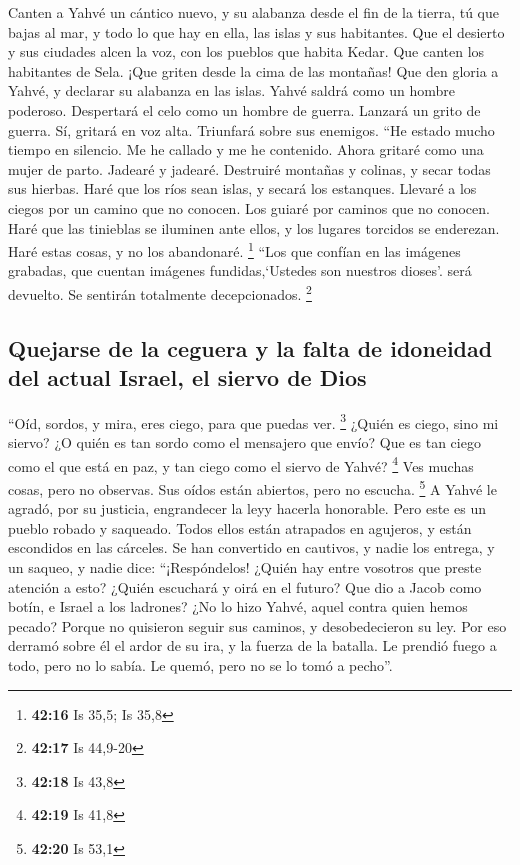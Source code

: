  Canten a Yahvé un cántico nuevo, y su alabanza desde el
fin de la tierra, tú que bajas al mar, y todo lo que hay en ella, las
islas y sus habitantes.  Que el desierto y sus ciudades
alcen la voz, con los pueblos que habita Kedar. Que canten los
habitantes de Sela. ¡Que griten desde la cima de las montañas!
 Que den gloria a Yahvé, y declarar su alabanza en las
islas.  Yahvé saldrá como un hombre poderoso. Despertará
el celo como un hombre de guerra. Lanzará un grito de guerra. Sí,
gritará en voz alta. Triunfará sobre sus enemigos.  ``He
estado mucho tiempo en silencio. Me he callado y me he contenido. Ahora
gritaré como una mujer de parto. Jadearé y jadearé. 
Destruiré montañas y colinas, y secar todas sus hierbas. Haré que los
ríos sean islas, y secará los estanques.  Llevaré a los
ciegos por un camino que no conocen. Los guiaré por caminos que no
conocen. Haré que las tinieblas se iluminen ante ellos, y los lugares
torcidos se enderezan. Haré estas cosas, y no los abandonaré.
\footnote{\textbf{42:16} Is 35,5; Is 35,8}  ``Los que
confían en las imágenes grabadas, que cuentan imágenes fundidas,`Ustedes
son nuestros dioses'. será devuelto. Se sentirán totalmente
decepcionados. \footnote{\textbf{42:17} Is 44,9-20}

\hypertarget{quejarse-de-la-ceguera-y-la-falta-de-idoneidad-del-actual-israel-el-siervo-de-dios}{%
\subsection{Quejarse de la ceguera y la falta de idoneidad del actual
Israel, el siervo de
Dios}\label{quejarse-de-la-ceguera-y-la-falta-de-idoneidad-del-actual-israel-el-siervo-de-dios}}

 ``Oíd, sordos, y mira, eres ciego, para que puedas ver.
\footnote{\textbf{42:18} Is 43,8}  ¿Quién es ciego, sino
mi siervo? ¿O quién es tan sordo como el mensajero que envío? Que es tan
ciego como el que está en paz, y tan ciego como el siervo de Yahvé?
\footnote{\textbf{42:19} Is 41,8}  Ves muchas cosas, pero
no observas. Sus oídos están abiertos, pero no escucha. \footnote{\textbf{42:20}
  Is 53,1}  A Yahvé le agradó, por su justicia,
engrandecer la leyy hacerla honorable.  Pero este es un
pueblo robado y saqueado. Todos ellos están atrapados en agujeros, y
están escondidos en las cárceles. Se han convertido en cautivos, y nadie
los entrega, y un saqueo, y nadie dice: ``¡Respóndelos! 
¿Quién hay entre vosotros que preste atención a esto? ¿Quién escuchará y
oirá en el futuro?  Que dio a Jacob como botín, e Israel
a los ladrones? ¿No lo hizo Yahvé, aquel contra quien hemos pecado?
Porque no quisieron seguir sus caminos, y desobedecieron su ley.
 Por eso derramó sobre él el ardor de su ira, y la fuerza
de la batalla. Le prendió fuego a todo, pero no lo sabía. Le quemó, pero
no se lo tomó a pecho''.

